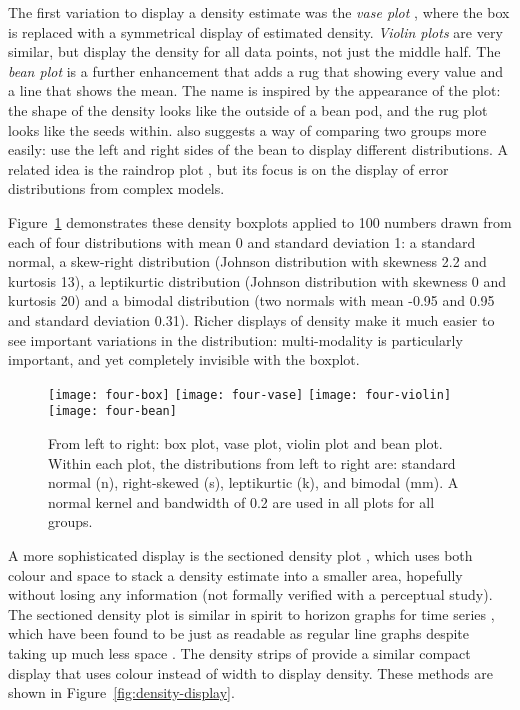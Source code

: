 \documentclass[oneside]{article}
\begin{document}
The first variation to display a density estimate was the \emph{vase plot} \citep{benjamini:1988}, where the box is replaced with a symmetrical display of estimated density. \emph{Violin plots} \citep{hintze:1998} are very similar, but display the density for all data points, not just the middle half. The \emph{bean plot} \citep{kampstra:2008} is a further enhancement that adds a rug that showing every value and a line that shows the mean. The name is inspired by the appearance of the plot: the shape of the density looks like the outside of a bean pod, and the rug plot looks like the seeds within. \citet{kampstra:2008} also suggests a way of comparing two groups more easily: use the left and right sides of the bean to display different distributions. A related idea is the raindrop plot \citep{barrowman:2003}, but its focus is on the display of error distributions from complex models.

Figure~\ref{fig:density} demonstrates these density boxplots applied to 100 numbers drawn from each of four distributions with mean 0 and standard deviation 1: a standard normal, a skew-right distribution (Johnson distribution with skewness 2.2 and kurtosis 13), a leptikurtic distribution (Johnson distribution with skewness 0 and kurtosis 20) and a bimodal distribution (two normals with mean -0.95 and 0.95 and standard deviation 0.31). Richer displays of density make it much easier to see important variations in the distribution: multi-modality is particularly important, and yet completely invisible with the boxplot.

\begin{figure}[htbp]
  \centering
  \texttt{[image: four-box]}%
  \texttt{[image: four-vase]}%
  \texttt{[image: four-violin]}%
  \texttt{[image: four-bean]}
  \caption{From left to right: box plot, vase plot, violin plot and bean plot.
Within each plot, the distributions from left to right are: standard normal (n), right-skewed (s), leptikurtic (k), and bimodal (mm). A normal kernel and bandwidth of 0.2 are used in all plots for all groups.}
  \label{fig:density}
\end{figure}

A more sophisticated display is the sectioned density plot \citep{cohen:2006}, which uses both colour and space to stack a density estimate into a smaller area, hopefully without losing any information (not formally verified with a perceptual study). The sectioned density plot is similar in spirit to horizon graphs for time series \citep{reijner:2008}, which have been found to be just as readable as regular line graphs despite taking up much less space \citep{heer:2009}. The density strips of \citet{jackson:2008} provide a similar compact display that uses colour instead of width to display density. These methods are shown in Figure~\ref{fig:density-display}.
\end{document}
